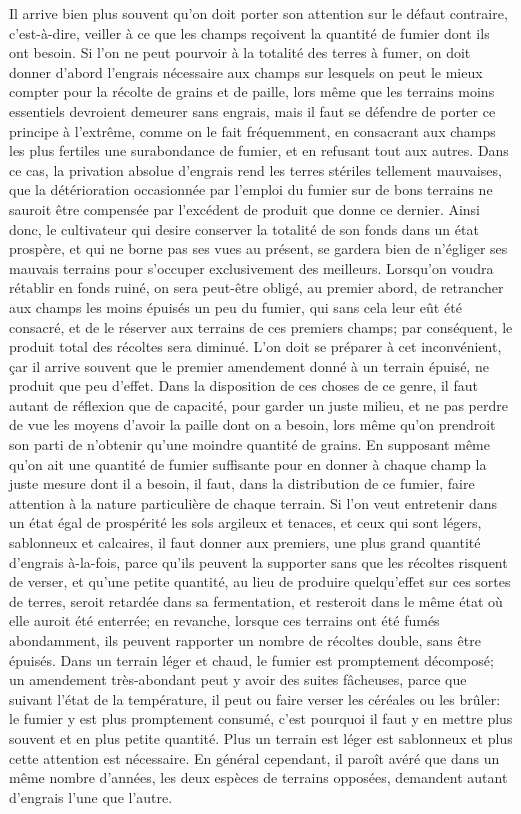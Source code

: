 Il arrive bien plus souvent qu'on doit porter son attention sur le défaut contraire, c'est-à-dire, veiller à ce que les champs reçoivent la quantité de fumier dont ils ont besoin. Si l'on ne peut pourvoir à la totalité des terres à fumer, on doit donner d'abord l'engrais\setcounter{page}{45} nécessaire aux champs sur lesquels on peut le mieux compter pour la récolte de grains et de paille, lors même que les terrains moins essentiels devroient demeurer sans engrais, mais il faut se défendre de porter ce principe à l'extrême, comme on le fait fréquemment, en consacrant aux champs les plus fertiles une surabondance de fumier, et en refusant tout aux autres. Dans ce cas, la privation absolue d'engrais rend les terres stériles tellement mauvaises, que la détérioration occasionnée par l'emploi du fumier sur de bons terrains ne sauroit être compensée par l'excédent de produit que donne ce dernier. Ainsi donc, le cultivateur qui desire conserver la totalité de son fonds dans un état prospère, et qui ne borne pas ses vues au présent, se gardera bien de n'égliger ses mauvais terrains pour s'occuper exclusivement des meilleurs.
Lorsqu'on voudra rétablir en fonds ruiné, on sera peut-être obligé, au premier abord, de retrancher aux champs les moins épuisés un peu du fumier, qui sans cela leur eût été consacré, et de le réserver aux terrains de ces premiers champs; par conséquent, le produit total des récoltes sera diminué. L'on doit se préparer à cet inconvénient, çar il arrive souvent que le premier amendement\setcounter{page}{46} donné à un terrain épuisé, ne produit que peu d'effet. Dans la disposition de ces choses de ce genre, il faut autant de réflexion que de capacité, pour garder un juste milieu, et ne pas perdre de vue les moyens d'avoir la paille dont on a besoin, lors même qu'on prendroit son parti de n'obtenir qu'une moindre quantité de grains.
En supposant même qu'on ait une quantité de fumier suffisante pour en donner à chaque champ la juste mesure dont il a besoin, il faut, dans la distribution de ce fumier, faire attention à la nature particulière de chaque terrain. Si l'on veut entretenir dans un état égal de prospérité les sols argileux et tenaces, et ceux qui sont légers, sablonneux et calcaires, il faut donner aux premiers, une plus grand quantité d'engrais à-la-fois, parce qu'ils peuvent la supporter sans que les récoltes risquent de verser, et qu'une petite quantité, au lieu de produire quelqu'effet sur ces sortes de terres, seroit retardée dans sa fermentation, et resteroit dans le même état où elle auroit été enterrée; en revanche, lorsque ces terrains ont été fumés abondamment, ils peuvent rapporter un nombre de récoltes double, sans être épuisés. Dans un terrain léger et chaud, le fumier est promptement décomposé;\setcounter{page}{47} un amendement très-abondant peut y avoir des suites fâcheuses, parce que suivant l'état de la température, il peut ou faire verser les céréales ou les brûler: le fumier y est plus promptement consumé, c'est pourquoi il faut y en mettre plus souvent et en plus petite quantité. Plus un terrain est léger est sablonneux et plus cette attention est nécessaire. En général cependant, il paroît avéré que dans un même nombre d'années, les deux espèces de terrains opposées, demandent autant d'engrais l'une que l'autre.
